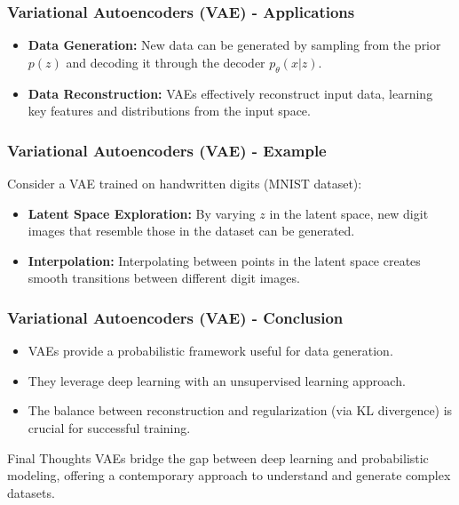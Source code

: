 \documentclass[aspectratio=169]{beamer}
\begin{document}
\begin{frame}[fragile]
    \frametitle{Variational Autoencoders (VAE) - Applications}
    \begin{itemize}
        \item \textbf{Data Generation:} New data can be generated by sampling from the prior $p(z)$ and decoding it through the decoder $p_\theta(x|z)$.
        \item \textbf{Data Reconstruction:} VAEs effectively reconstruct input data, learning key features and distributions from the input space.
    \end{itemize}
\end{frame}

\begin{frame}[fragile]
    \frametitle{Variational Autoencoders (VAE) - Example}
    Consider a VAE trained on handwritten digits (MNIST dataset):
    \begin{itemize}
        \item \textbf{Latent Space Exploration:} By varying $z$ in the latent space, new digit images that resemble those in the dataset can be generated.
        \item \textbf{Interpolation:} Interpolating between points in the latent space creates smooth transitions between different digit images.
    \end{itemize}
\end{frame}

\begin{frame}[fragile]
    \frametitle{Variational Autoencoders (VAE) - Conclusion}
    \begin{itemize}
        \item VAEs provide a probabilistic framework useful for data generation.
        \item They leverage deep learning with an unsupervised learning approach.
        \item The balance between reconstruction and regularization (via KL divergence) is crucial for successful training.
    \end{itemize}
    \begin{block}{Final Thoughts}
        VAEs bridge the gap between deep learning and probabilistic modeling, offering a contemporary approach to understand and generate complex datasets.
    \end{block}
\end{frame}
\end{document}

